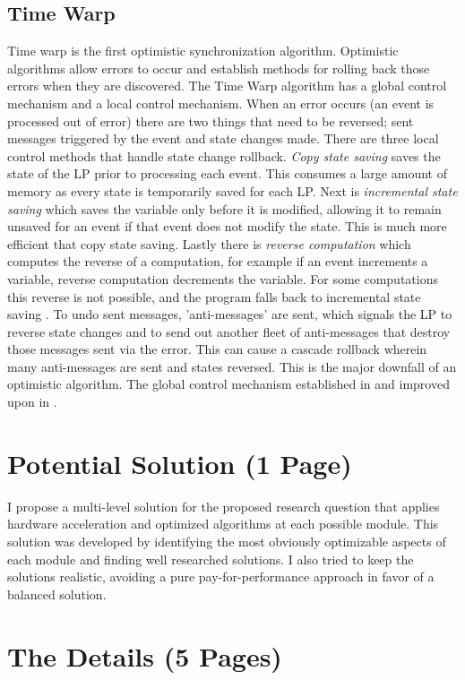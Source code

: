 \documentclass[conference]{IEEEtran}
\begin{document}
\subsection{Time Warp}
Time warp is the first optimistic synchronization algorithm. Optimistic algorithms allow errors to occur and establish methods for rolling back those errors when they are discovered. The Time Warp algorithm has a global control mechanism and a local control mechanism. When an error occurs (an event is processed out of error) there are two things that need to be reversed; sent messages triggered by the event and state changes made. There are three local control methods that handle state change rollback. \textit{Copy state saving} saves the state of the LP prior to processing each event. This consumes a large amount of memory as every state is temporarily saved for each LP. Next is \textit{incremental state saving} which saves the variable only before it is modified, allowing it to remain unsaved for an event if that event does not modify the state. This is much more efficient that copy state saving. Lastly there is \textit{reverse computation} which computes the reverse of a computation, for example if an event increments a variable, reverse computation decrements the variable. For some computations this reverse is not possible, and the program falls back to incremental state saving \cite{b2}. To undo sent messages, 'anti-messages' are sent, which signals the LP to reverse state changes and to send out another fleet of anti-messages that destroy those messages sent via the error. This can cause a cascade rollback wherein many anti-messages are sent and states reversed. This is the major downfall of an optimistic algorithm.
The global control mechanism established in \cite{b6} and improved upon in \cite{b7}.


\section{Potential Solution (1 Page)}
I propose a multi-level solution for the proposed research question that applies hardware acceleration and optimized algorithms at each possible module. This solution was developed by identifying the most obviously optimizable aspects of each module and finding well researched solutions. I also tried to keep the solutions realistic, avoiding a pure pay-for-performance approach in favor of a balanced solution.
\section{The Details (5 Pages)}
\end{document}
